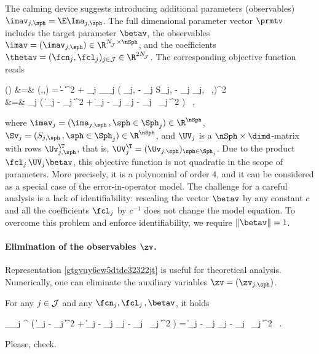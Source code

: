The calming device suggests introducing additional parameters (observables) 
\( \imav_{j,\sph} = \E \Ima_{j,\sph} \).
The full dimensional parameter vector \( \prmtv \) includes
the target parameter \( \betav \), the observables \( \imav = (\imav_{j,\sph}) \in \R^{\nJJJ \times \nSph} \), 
and the coefficients \( \thetav = (\fcn_{j},\fcl_{j})_{j \in \JJJ} \in \R^{2\nJJJ} \).
The corresponding objective function reads
\begin{EQA}
	\LL(\prmtv)
	&=&
	\LL(\betav,\thetav,\imav)
	=
	 \| \Imav - \imav \|^{2} 
	+  \sum_{j \in \JJJ} \sum_{\sph \in \Sph_{j}} 
		\bigl( \ima_{j,\sph} - \fcn_{j} S_{j,\sph} - \fcl_{j} \langle \Uv_{j,\sph} \, ,\betav \rangle \bigr)^{2} 
	\\
	&=&
	 \sum_{j \in \JJJ} 
	\bigl( \| \Imav_{j} - \imav_{j} \|^{2} + \bigl\| \imav_{j} - \fcn_{j} \Sv_{j} - \fcl_{j} \, \UV_{j} \betav \bigr\|^{2} \bigr) 
	\, ,
\label{gtgyuy6ew5dtde32322jt}
\end{EQA}
where \( \imav_{j} = (\ima_{j,\sph} \, , \sph \in \Sph_{j}) \in \R^{\nSph} \),
\( \Sv_{j} = (S_{j,\sph} \, , \sph \in \Sph_{j}) \in \R^{\nSph} \),
and \( \UV_{j} \) is a \( \nSph \times \dimd \)-matrix with rows \( \Uv_{j,\sph}^{\T} \), that is,
\( \UV_{j}^{\T} = (\Uv_{j,\sph})_{\sph \in \Sph_{j}} \).
Due to the product \( \fcl_{j} \, \UV_{j} \betav \), this objective function is not quadratic in the scope of parameters.
More precisely, it is a polynomial of order 4, and it can be considered as a special case of the error-in-operator model.
The challenge for a careful analysis is a lack of identifiability: rescaling the vector \( \betav \) by any constant
\( c \) and all the coefficients \( \fcl_{j} \) by \( c^{-1} \) does not change the model equation. 
To overcome this problem and enforce identifiability, we require \( \| \betav \| = 1 \).

\paragraph{Elimination of the observables \( \zv \).}
Representation \eqref{gtgyuy6ew5dtde32322jt} is useful for theoretical analysis.
Numerically, one can eliminate the auxiliary variables \( \zv = (\zv_{j,\sph}) \).

\begin{lemma}
For any \( j \in \mathcal{J} \) and any
\( \fcn_{j},\fcl_{j} \, , \betav \), it holds
\begin{EQA}[c]
	\inf_{\imav_{j} \in \R^{\nSph}} \Bigl( 
		\| \Imav_{j} - \imav_{j} \|^{2} 
		+ \bigl\| \imav_{j} - \fcn_{j} \Sv_{j} - \fcl_{j} \, \UV_{j} \betav \bigr\|^{2} 
	\Bigr) 
	=
	 \bigl\| \Imav_{j} - \fcn_{j} \Sv_{j} - \fcl_{j} \, \UV_{j} \betav \bigr\|^{2}
	\, .
\end{EQA}
\end{lemma}
{\color{blue} Please, check.}


